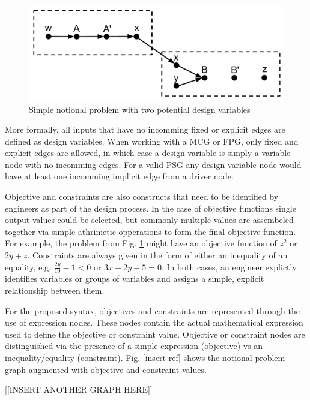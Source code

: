 \begin{figure}[htb!]
  \begin{center}
    \includegraphics[width=.6\textwidth]{images/design_vars_graph}
  \end{center}
  \caption{Simple notional problem with two potential design variables \label{f:design vars}}
\end{figure}

More formally, all inputs that have no incomming fixed or explicit edges are defined
as design variables. When working with a MCG or FPG, only fixed and explicit edges are allowed, 
in which case a design variable is simply a variable node with no incomming edges. For a valid PSG 
any design variable node would have at least one incomming implicit edge from a driver node. 

Objective and constraints are also constructs that need to be identified by engineers 
as part of the design process. In the case of objective functions single output values 
could be selected, but commonly multiple values are assembeled together via simple 
athrimetic opperations to form the final objective function. For example, the problem from 
Fig. \ref{f:design vars} might have an objective function of $z^2$ or $2y + z$. Constraints are 
always given in the form of either an inequality of an equality, e.g. 
$\frac{2y}{10}-1<0$ or $3x+2y - 5=0$. In both cases, an engineer explictly identifies variables 
or groups of variables and assigns a simple, explicit relationship between them. 

For the proposed syntax, objectives and constraints are represented through the use of 
expression nodes. These nodes contain the actual mathematical expression used to define the 
objective or constraint value. Objective or constraint nodes are distinguished
via the presence of a simple expression (objective) vs an inequality/equality (constraint). 
Fig. [insert ref] shows the notional problem graph augmented with objective and 
constraint values. 

[[INSERT ANOTHER GRAPH HERE]]

